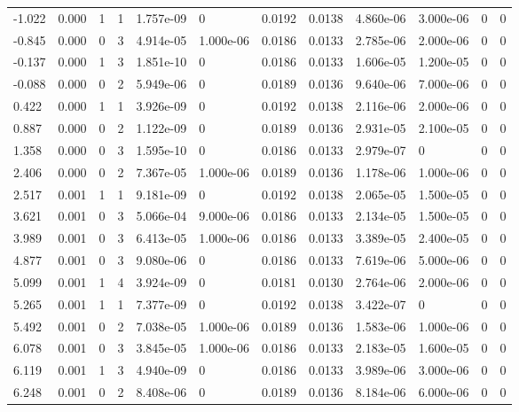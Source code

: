 \documentclass[preview]{standalone}
\begin{document}
{{\begin{tabular}{L{1.2cm}C{1.2cm} C{0.3cm}C{0.5cm} C{1.4cm}C{1.4cm} C{1.4cm}C{1.4cm} C{1.6cm}C{1.6cm} C{1.6cm}C{1.6cm}}
  -1.022  &  0.000  & 1     &  1 &  1.757e-09  & 0  &  0.0192&   0.0138& 4.860e-06 & 3.000e-06   &  0 & 0  \\ 
  -0.845  &  0.000  & 0     &  3 &  4.914e-05  & 1.000e-06  &  0.0186&   0.0133& 2.785e-06 & 2.000e-06   &  0 & 0  \\ 
  -0.137  &  0.000  & 1     &  3 &  1.851e-10  & 0  &  0.0186&   0.0133& 1.606e-05 & 1.200e-05   &  0 & 0  \\ 
  -0.088  &  0.000  & 0     &  2 &  5.949e-06  & 0  &  0.0189&   0.0136& 9.640e-06 & 7.000e-06   &  0 & 0  \\ 
  0.422  &  0.000  & 1     &  1 &  3.926e-09  & 0  &  0.0192&   0.0138& 2.116e-06 & 2.000e-06   &  0 & 0  \\ 
  0.887  &  0.000  & 0     &  2 &  1.122e-09  & 0  &  0.0189&   0.0136& 2.931e-05 & 2.100e-05   &  0 & 0  \\ 
  1.358  &  0.000  & 0     &  3 &  1.595e-10  & 0  &  0.0186&   0.0133& 2.979e-07 & 0   &  0 & 0  \\ 
  2.406  &  0.000  & 0     &  2 &  7.367e-05  & 1.000e-06  &  0.0189&   0.0136& 1.178e-06 & 1.000e-06   &  0 & 0  \\ 
  2.517  &  0.001  & 1     &  1 &  9.181e-09  & 0  &  0.0192&   0.0138& 2.065e-05 & 1.500e-05   &  0 & 0  \\ 
  3.621  &  0.001  & 0     &  3 &  5.066e-04  & 9.000e-06  &  0.0186&   0.0133& 2.134e-05 & 1.500e-05   &  0 & 0  \\ 
  3.989  &  0.001  & 0     &  3 &  6.413e-05  & 1.000e-06  &  0.0186&   0.0133& 3.389e-05 & 2.400e-05   &  0 & 0  \\ 
  4.877  &  0.001  & 0     &  3 &  9.080e-06  & 0  &  0.0186&   0.0133& 7.619e-06 & 5.000e-06   &  0 & 0  \\ 
  5.099  &  0.001  & 1     &  4 &  3.924e-09  & 0  &  0.0181&   0.0130& 2.764e-06 & 2.000e-06   &  0 & 0  \\ 
  5.265  &  0.001  & 1     &  1 &  7.377e-09  & 0  &  0.0192&   0.0138& 3.422e-07 & 0   &  0 & 0  \\ 
  5.492  &  0.001  & 0     &  2 &  7.038e-05  & 1.000e-06  &  0.0189&   0.0136& 1.583e-06 & 1.000e-06   &  0 & 0  \\ 
  6.078  &  0.001  & 0     &  3 &  3.845e-05  & 1.000e-06  &  0.0186&   0.0133& 2.183e-05 & 1.600e-05   &  0 & 0  \\ 
  6.119  &  0.001  & 1     &  3 &  4.940e-09  & 0  &  0.0186&   0.0133& 3.989e-06 & 3.000e-06   &  0 & 0  \\ 
  6.248  &  0.001  & 0     &  2 &  8.408e-06  & 0  &  0.0189&   0.0136& 8.184e-06 & 6.000e-06   &  0 & 0  \\ 

\end{tabular}}}
\end{document}
